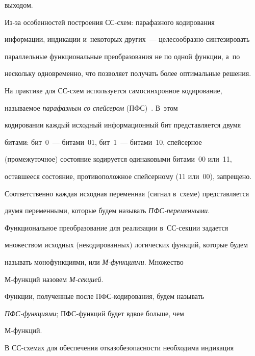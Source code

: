 выходом.


   


   Из-за особенностей построения СС-схем: парафазного кодирования 


информации, индикации и~некоторых других~--- целесообразно синтезировать 


параллельные функциональные преобразования не по одной функции, а~по 


нескольку одновременно, что позволяет получать более оптимальные решения.


   


   На практике для СС-схем используется самосинхронное кодирование, 


называемое \textit{парафазным со спейсером} (ПФС)~\cite{1-pl}. В~этом 


кодировании каждый исходный информационный бит представляется двумя 


битами: бит~0~--- битами~01, бит~1~--- битами~10, спейсерное 


(промежуточное) состояние кодируется одинаковыми битами~00 или~11, 


оставшееся состояние, противоположное спейсерному (11 или~00), запрещено. 


Соответственно каждая исходная переменная (сигнал в~схеме) представляется 


двумя переменными, которые будем называть \textit{ПФС-пе\-ре\-мен\-ными}.


   


   Функциональное преобразование для реализации в~СС-сек\-ции задается 


множеством исходных (некодированных) логических функций, которые будем 


называть монофункциями, или \textit{М-функ\-ци\-ями}. Множество  


М-функ\-ций назовем \textit{М-сек\-цией}.


   


   Функции, полученные после ПФС-ко\-ди\-ро\-ва\-ния, будем называть 


\textit{ПФС-функ\-ци\-ями}; ПФС-функ\-ций будет вдвое больше, чем  


М-функ\-ций.


   


   В СС-схемах для обеспечения отказобезопасности необходима индикация 



